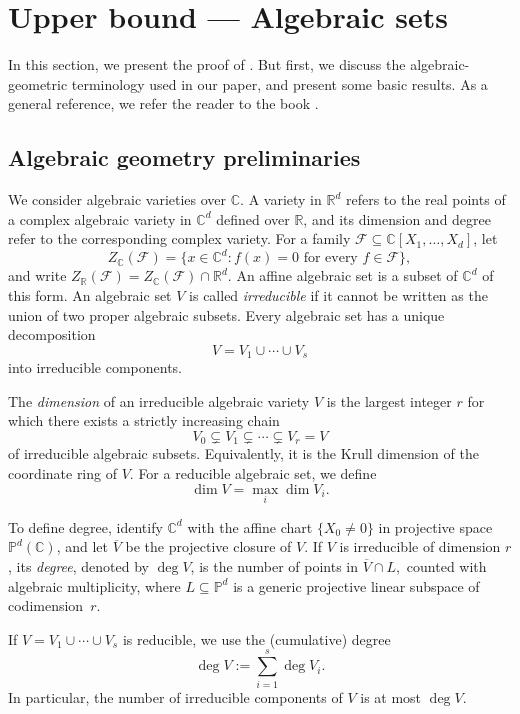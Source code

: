 \documentclass[11pt]{article}
\theoremstyle{plain}
\theoremstyle{definition}
\begin{document}
	
	\section{Upper bound --- Algebraic sets}\label{sect:upper}

    In this section, we present the proof of . But first, we discuss the  algebraic-geometric terminology used in our paper, and present some basic results.  As a general reference, we refer the reader to the book \cite{Cox}.

    \subsection{Algebraic geometry preliminaries}\label{sect:alg_geo}
	
	We consider algebraic varieties over $\mathbb C$. A variety in $\mathbb R^d$ refers to the real points of a complex algebraic variety in $\mathbb C^d$
	defined over $\mathbb R$, and its dimension and degree refer to the corresponding complex variety. For a family $\mathcal F\subseteq
	\mathbb C[X_1,\ldots,X_d]$, let
	\[
	Z_{\mathbb{C}}(\mathcal F)
	=
	\{x\in\mathbb C^d:f(x)=0\text{ for every }f\in\mathcal F\},
	\]
	and write $Z_{\mathbb{R}}(\mathcal F)=Z_{\mathbb{C}}(\mathcal F)\cap \mathbb{R}^d.$ An affine algebraic set is a subset of $\mathbb C^d$ of this form. An
	algebraic set $V$ is called \emph{irreducible} if it cannot be written
	as the union of two proper algebraic subsets. Every algebraic set has
	a unique decomposition
	\[
	V=V_1\cup\cdots\cup V_s
	\]
	into irreducible components.
	
	The \emph{dimension} of an irreducible algebraic variety $V$ is the
	largest integer $r$ for which there exists a strictly increasing chain
	\[
	V_0\subsetneq V_1\subsetneq\cdots\subsetneq V_r=V
	\]
	of irreducible algebraic subsets. Equivalently, it is the Krull
	dimension of the coordinate ring of $V$. For a reducible algebraic
	set, we define
	\[
	\dim V=\max_i\dim V_i.
	\]
	
	To define degree, identify $\mathbb C^d$ with the affine chart
	$\{X_0\ne0\}$ in projective space $\mathbb P^d(\mathbb C)$, and let
	$\overline V$ be the projective closure of $V$. If $V$ is irreducible
	of dimension $r$, its \emph{degree}, denoted by $\deg V$, is the number
	of points in  $\overline V\cap L,$ counted with algebraic multiplicity, where $L\subseteq\mathbb P^d$ is a generic projective linear subspace of codimension~$r$.
	
	If $V=V_1\cup\cdots\cup V_s$ is reducible, we use the (cumulative) degree
	\[
	\deg V:=\sum_{i=1}^s\deg V_i.
	\]
	In particular, the number of irreducible components of $V$ is at most
	$\deg V$.
	
\end{document}
